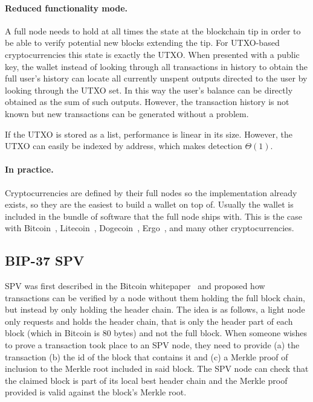 \paragraph{Reduced functionality mode.}
A full node needs to hold at all times the state at the blockchain tip in order to be able to verify potential new blocks extending the tip. For UTXO-based cryptocurrencies this state is exactly the UTXO. When presented with a public key, the wallet instead of looking through all transactions in history to obtain the full user's history can locate all currently unspent outputs directed to the user by looking through the UTXO set. In this way the user's balance can be directly obtained as the sum of such outputs. However, the transaction history is not known but new transactions can be generated without a problem.

If the UTXO is stored as a list, performance is linear in its size. However, the UTXO can easily be indexed by address, which makes detection $\Theta(1)$.

\paragraph{In practice.}
Cryptocurrencies are defined by their full nodes so the implementation already exists, so they are the easiest to build a wallet on top of. Usually the wallet is included in the bundle of software that the full node ships with. This is the case with Bitcoin~\cite{bitcoin}, Litecoin~\cite{litecoin}, Dogecoin~\cite{dogecoin}, Ergo~\cite{ergo}, and many other cryptocurrencies.

\subsection{BIP-37 SPV}
SPV was first described in the Bitcoin whitepaper~\cite{bitcoin} and proposed how transactions can be verified by a node without them holding the full block chain, but instead by only holding the header chain.
The idea is as follows, a light node only requests and holds the header chain, that is only the header part of each block (which in Bitcoin is 80 bytes) and not the full block. When someone wishes to prove a transaction took place to an SPV node, they need to provide (a) the transaction (b) the id of the block that contains it and (c) a Merkle proof of inclusion to the Merkle root included in said block. The SPV node can check that the claimed block is part of its local best header chain and the Merkle proof provided is valid against the block's Merkle root.

